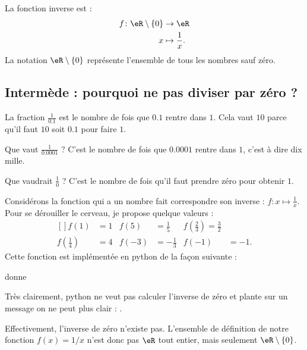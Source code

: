 \begin{example}
    La fonction inverse est :
    \begin{equation}
        \begin{aligned}
            f\colon \eR\setminus\{ 0 \}&\to \eR \\
            x&\mapsto \frac{1}{ x }. 
        \end{aligned}
    \end{equation}
    La notation \( \eR\setminus\{ 0 \}\) représente l'ensemble de tous les nombres sauf zéro.
\end{example}

\subsection{Intermède : pourquoi ne pas diviser par zéro ?}

La fraction \( \frac{1}{ 0.1 }\) est le nombre de fois que \( 0.1\) rentre dans \( 1\). Cela vaut \( 10\) parce qu'il faut \( 10\) soit \( 0.1\) pour faire \( 1\).

Que vaut \( \frac{1}{ 0.0001 }\) ? C'est le nombre de fois que \( 0.0001\) rentre dans \( 1\), c'est à dire dix mille.

Que vaudrait \( \frac{1}{ 0 }\) ? C'est le nombre de fois qu'il faut prendre zéro pour obtenir \( 1\).

\begin{example}
    Considérons la fonction qui a un nombre fait correspondre son inverse : \( f\colon x\mapsto \frac{1}{ x }\). Pour se dérouiller le cerveau, je propose quelque valeurs :
    \begin{equation}
        \begin{aligned}[]
            f(1)&=1&f(5)&=\frac{1}{ 5 }&f(\frac{ 2 }{ 3 })=\frac{ 3 }{ 2 }\\
            f(\frac{ 1 }{ 4 })&=4&f(-3)&=-\frac{1}{ 3 }&f(-1)&=-1.
        \end{aligned}
    \end{equation}
    Cette fonction est implémentée en python de la façon suivante :



donne

%

Très clairement, python ne veut pas calculer l'inverse de zéro et plante sur un message on ne peut plus clair : .

Effectivement, l'inverse de zéro n'existe pas. L'ensemble de définition de notre fonction \( f(x)=1/x\) n'est donc pas \( \eR\) tout entier, mais seulement \( \eR\setminus\{ 0 \}\).

\end{example}

